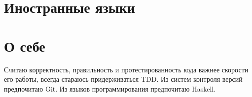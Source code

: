 \documentclass[11pt,a4paper,sans]{moderncv}        %
\begin{document}
  

\section{Иностранные языки}

\section{О себе}
Считаю корректность, правильность и протестированность кода важнее скорости его
работы, всегда стараюсь придерживаться TDD. Из систем контроля версий
предпочитаю Git. Из языков программирования предпочитаю Haskell.

\nocite{*}

\end{document}
